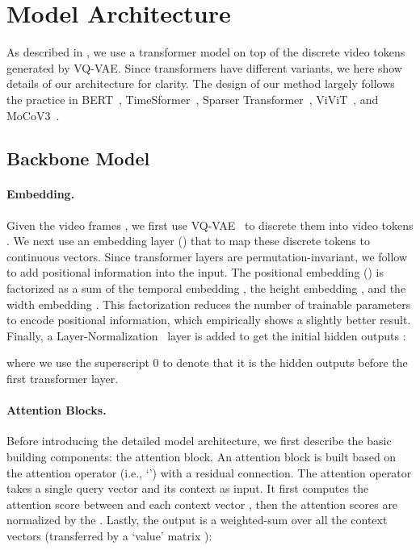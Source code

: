 \appendix


\section{Model Architecture}
\label{sec:appen_model}
As described in , we use a transformer model on top of the discrete video tokens generated by VQ-VAE. Since transformers have different variants, we here show details of our architecture for clarity.
The design of our method largely follows the practice in BERT~\cite{devlin2019bert}, TimeSformer~\cite{bertasius2021space}, Sparser Transformer~\cite{child2019generating}, ViViT~\cite{arnab2021vivit}, and MoCoV3~\cite{chen2021mocov3}.

\subsection{Backbone Model}

\paragraph{Embedding.} 
Given the video frames , we first use VQ-VAE~\cite{van2017neural,ramesh2021zero} to discrete them into video tokens . 
We next use an embedding layer () that to map these discrete tokens to continuous vectors. 
Since transformer layers are permutation-invariant, we follow~\cite{dosovitskiy2020image,devlin2019bert} to add positional information into the input. 
The positional embedding () is factorized as a sum of the temporal embedding , the height embedding , and the width embedding . 
This factorization reduces the number of trainable parameters to encode positional information, which empirically shows a slightly better result.
Finally, a Layer-Normalization~\cite{ba2016layer} layer is added to get the initial hidden outputs :

where we use the superscript 0 to denote that it is the hidden outputs before the first transformer layer.

\paragraph{Attention Blocks.}
Before introducing the detailed model architecture, we first describe the basic building components: the attention block.
An attention block is built based on the attention operator (i.e., `') with a residual connection.
The attention operator takes a single query vector  and its context  as input.
It first computes the attention score between  and each context vector , then the attention scores are normalized by the .
Lastly, the output is a weighted-sum over all the context vectors (transferred by a `value' matrix ):

